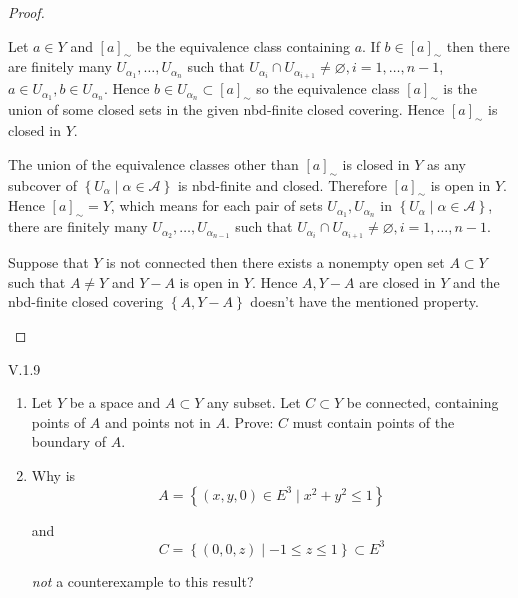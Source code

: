 \begin{proof}
\begin{enumerate}[label={(\alph*)}]
		      Let \( a \in Y \) and \( {[a]}_{\sim} \) be the equivalence class containing \( a \). If \( b \in {[a]}_{\sim} \) then there are finitely many \( U_{\alpha_{1}}, \ldots, U_{\alpha_{n}} \) such that \( U_{\alpha_{i}} \cap U_{\alpha_{i+1}} \ne \varnothing, i = 1, \ldots, n - 1 \), \( a \in U_{\alpha_{1}}, b \in U_{\alpha_{n}} \). Hence \( b \in U_{\alpha_{n}} \subset {[a]}_{\sim} \) so the equivalence class \( {[a]}_{\sim} \) is the union of some closed sets in the given nbd-finite closed covering. Hence \( {[a]}_{\sim} \) is closed in \( Y \).

		      The union of the equivalence classes other than \( {[a]}_{\sim} \) is closed in \( Y \) as any subcover of \( \left\{ U_{\alpha} \mid \alpha \in \mathscr{A} \right\} \) is nbd-finite and closed. Therefore \( {[a]}_{\sim} \) is open in \( Y \). Hence \( {[a]}_{\sim} = Y \), which means for each pair of sets \( U_{\alpha_{1}}, U_{\alpha_{n}} \) in \( \left\{ U_{\alpha} \mid \alpha \in \mathscr{A} \right\} \), there are finitely many \( U_{\alpha_{2}}, \ldots, U_{\alpha_{n-1}} \) such that \( U_{\alpha_{i}} \cap U_{\alpha_{i+1}} \ne \varnothing, i = 1, \ldots, n - 1 \).

		      Suppose that \( Y \) is not connected then there exists a nonempty open set \( A \subset Y \) such that \( A \ne Y \) and \( Y - A \) is open in \( Y \). Hence \( A, Y - A \) are closed in \( Y \) and the nbd-finite closed covering \( \left\{ A, Y - A \right\} \) doesn't have the mentioned property.
	\end{enumerate}
\end{proof}

\begin{problem}{V.1.9}
\begin{enumerate}[label={(\alph*)}]
	\item Let \(Y\) be a space and \(A \subset Y\) any subset. Let \(C \subset Y\) be connected, containing points of \(A\) and points not in \(A\). Prove: \(C\) must contain points of the boundary of \(A\).
	\item Why is
	      \[
		      A = \left\{ (x, y, 0) \in E^{3} \mid x^{2} + y^{2} \le 1 \right\}
	      \]

	      and
	      \[
		      C = \left\{ (0, 0, z) \mid -1 \le z \le 1 \right\} \subset E^{3}
	      \]

	      \textit{not} a counterexample to this result?
\end{enumerate}
\end{problem}

